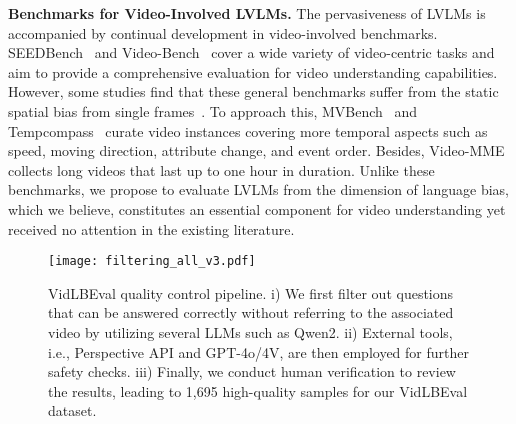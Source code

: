 \noindent \textbf{Benchmarks for Video-Involved LVLMs.} The pervasiveness of LVLMs is accompanied by continual development in video-involved benchmarks. SEEDBench~\cite{li2024seed:seedbench} and Video-Bench~\cite{ning2023video:videobench} cover a wide variety of video-centric tasks and aim to provide a comprehensive evaluation for video understanding capabilities. However, some studies find that these general benchmarks suffer from the static spatial bias from single frames~\cite{dblei:singlebias}. To approach this, MVBench~\cite{li2024mvbench} and Tempcompass~\cite{liu2024tempcompass} curate video instances covering more temporal aspects such as speed, moving direction, attribute change, and event order. Besides, Video-MME~\cite{fu2024videomme} collects long videos that last up to one hour in duration. Unlike these benchmarks, we propose to evaluate LVLMs from the dimension of language bias, which we believe, constitutes an essential component for video understanding yet received no attention in the existing literature.

\begin{figure*}[ht]
\centering
\texttt{[image: filtering\_all\_v3.pdf]}
\caption{VidLBEval quality control pipeline. i) We first filter out questions that can be answered correctly without referring to the associated video by utilizing several LLMs such as Qwen2. ii) External tools, i.e., Perspective API and GPT-4o/4V, are then employed for further safety checks. iii) Finally, we conduct human verification to review the results, leading to 1,695 high-quality samples for our VidLBEval dataset.}
\label{fig:filtering_all}
\end{figure*}